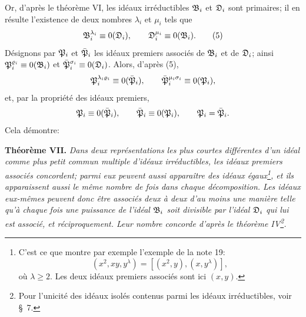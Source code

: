 Or, d'après le théorème VI, les idéaux irréductibles $\mathfrak{B}_i$ et $\mathfrak{D}_i$ sont primaires; il en résulte l'existence de deux nombres $\lambda_i$ et $\mu_i$ tels que
\begin{equation}
 \mathfrak{B}_i^{\lambda_i}\equiv0(\mathfrak{D}_i),
 \qquad
 \mathfrak{D}_i^{\mu_i}\equiv0(\mathfrak{B}_i).
\tag{5}
\end{equation}
Désignons par $\mathfrak{P}_i$ et $\bar{\mathfrak{P}}_i$ les idéaux premiers associés de $\mathfrak{B}_i$ et de $\mathfrak{D}_i$; ainsi $\mathfrak{P}_i^{\varrho_i}\equiv0(\mathfrak{B}_i)$ et $\bar{\mathfrak{P}}_i^{\sigma_i}\equiv0(\mathfrak{D}_i)$. Alors, d'après (5),
\[
 \mathfrak{P}_i^{\lambda_i\varrho_i}\equiv0(\bar{\mathfrak{P}}_i),
 \qquad
 \bar{\mathfrak{P}}_i^{\mu_i\sigma_i}\equiv0(\mathfrak{P}_i),
\]
et, par la propriété des idéaux premiers,
\[
 \mathfrak{P}_i\equiv0(\bar{\mathfrak{P}}_i),
 \qquad
 \bar{\mathfrak{P}}_i\equiv0(\mathfrak{P}_i),
 \qquad
 \mathfrak{P}_i=\bar{\mathfrak{P}}_i.
\]
Cela démontre:

\textbf{Théorème VII.} \emph{Dans deux représentations les plus courtes différentes d'un idéal comme plus petit commun multiple d'idéaux irréductibles, les idéaux premiers associés concordent; parmi eux peuvent aussi apparaître des idéaux égaux\footnote{C'est ce que montre par exemple l'exemple de la note 19:
\[
 (x^2,xy,y^\lambda)=[(x^2,y),(x,y^\lambda)],
\]
où $\lambda\ge2$. Les deux idéaux premiers associés sont ici $(x,y)$.}, et ils apparaissent aussi le même nombre de fois dans chaque décomposition. Les idéaux eux-mêmes peuvent donc être associés deux à deux d'au moins une manière telle qu'à chaque fois une puissance de l'idéal $\mathfrak{B}_i$ soit divisible par l'idéal $\mathfrak{D}_i$ qui lui est associé, et réciproquement. Leur nombre concorde d'après le théorème IV\footnote{Pour l'unicité des idéaux \og{} isolés \fg{} contenus parmi les idéaux irréductibles, voir \S~7.}.}
